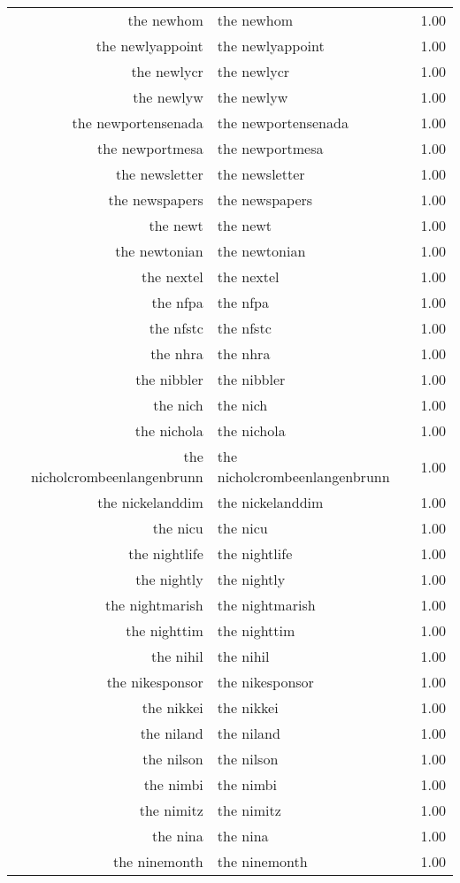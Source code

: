 \begin{table}[ht]
\begin{tabular}{rlr}
  the newhom & the newhom & 1.00 \\ 
  the newlyappoint & the newlyappoint & 1.00 \\ 
  the newlycr & the newlycr & 1.00 \\ 
  the newlyw & the newlyw & 1.00 \\ 
  the newportensenada & the newportensenada & 1.00 \\ 
  the newportmesa & the newportmesa & 1.00 \\ 
  the newsletter & the newsletter & 1.00 \\ 
  the newspapers & the newspapers & 1.00 \\ 
  the newt & the newt & 1.00 \\ 
  the newtonian & the newtonian & 1.00 \\ 
  the nextel & the nextel & 1.00 \\ 
  the nfpa & the nfpa & 1.00 \\ 
  the nfstc & the nfstc & 1.00 \\ 
  the nhra & the nhra & 1.00 \\ 
  the nibbler & the nibbler & 1.00 \\ 
  the nich & the nich & 1.00 \\ 
  the nichola & the nichola & 1.00 \\ 
  the nicholcrombeenlangenbrunn & the nicholcrombeenlangenbrunn & 1.00 \\ 
  the nickelanddim & the nickelanddim & 1.00 \\ 
  the nicu & the nicu & 1.00 \\ 
  the nightlife & the nightlife & 1.00 \\ 
  the nightly & the nightly & 1.00 \\ 
  the nightmarish & the nightmarish & 1.00 \\ 
  the nighttim & the nighttim & 1.00 \\ 
  the nihil & the nihil & 1.00 \\ 
  the nikesponsor & the nikesponsor & 1.00 \\ 
  the nikkei & the nikkei & 1.00 \\ 
  the niland & the niland & 1.00 \\ 
  the nilson & the nilson & 1.00 \\ 
  the nimbi & the nimbi & 1.00 \\ 
  the nimitz & the nimitz & 1.00 \\ 
  the nina & the nina & 1.00 \\ 
  the ninemonth & the ninemonth & 1.00 \\ 

\end{tabular}
\end{table}
